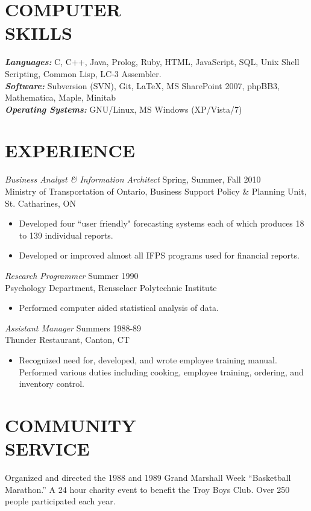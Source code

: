 \documentclass[margin]{res}
\begin{document}
\begin{resume}
\section{COMPUTER \\ SKILLS}
	{\sl \textbf{Languages:}} C, C++, Java, Prolog, Ruby, HTML,
	JavaScript, SQL, Unix Shell Scripting, Common Lisp, LC-3 Assembler. \\
	{\sl \textbf{Software:}} Subversion (SVN), Git, LaTeX,
	MS SharePoint 2007, phpBB3, Mathematica, Maple, Minitab \\
	{\sl \textbf{Operating Systems:}} GNU/Linux, MS Windows (XP/Vista/7)
 
\section{EXPERIENCE}
	{\sl Business Analyst \& Information Architect} \hfill Spring, Summer, Fall 2010 \\
    Ministry of Transportation of Ontario,
    Business Support Policy \& Planning Unit, St. Catharines, ON 
	\begin{itemize}  \itemsep -2pt %
    \item Developed four ``user friendly" forecasting systems each of
    which produces 18 to 139 individual reports. 
    \item Developed or improved almost all IFPS programs used for financial reports.
	\end{itemize}
	
	{\sl Research Programmer} \hfill Summer 1990 \\
    Psychology Department, Rensselaer Polytechnic Institute 
	\begin{itemize}  \itemsep -2pt %
    \item Performed computer aided statistical analysis of data. 
    \end{itemize} 
        
	{\sl Assistant Manager} \hfill Summers 1988-89 \\
    Thunder Restaurant, Canton, CT
	\begin{itemize}
    \item Recognized need for, developed, and wrote employee training manual.
    Performed various duties including cooking, employee training, ordering, and inventory control.
	\end{itemize} 
 
\section{COMMUNITY \\ SERVICE}
	Organized and directed the 1988 and 1989 Grand Marshall Week \newline ``Basketball Marathon.''
	A 24 hour charity event to benefit the Troy Boys Club. Over 250 people participated each year. 


\end{resume}
\end{document}
